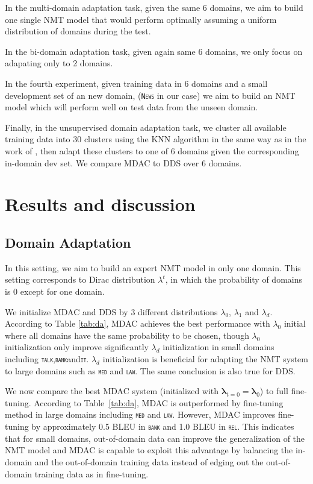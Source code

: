 \documentclass[11pt]{article}
\newcommand{\domain}[1]{\texttt{\textsc{#1}}}
\newcommand{\vlambda}{\ensuremath{\boldsymbol\lambda}\xspace} %
\begin{document}
In the multi-domain adaptation task, given the same 6 domains, we aim to build one single NMT model that would perform optimally assuming a uniform distribution of domains during the test.

In the bi-domain adaptation task, given again same 6 domains, we only focus on adapating only to 2 domains.

In the fourth experiment, given training data in 6 domains and a small development set of an new domain, (\domain{News} in our case) we aim to build an NMT model which will perform well on test data from the unseen domain.

Finally, in the unsupervised domain adaptation task, we cluster all available training data into 30 clusters using the KNN algorithm in the same way as in the work of \citet{Tars18multidomain}, then adapt these clusters to one of 6 domains given the corresponding in-domain dev set. We compare MDAC to DDS over 6 domains.

\section{Results and discussion \label{sec:results}}

\subsection{Domain Adaptation}\label{ssec:da}
In this setting, we aim to build an expert NMT model in only one domain. This setting corresponds to Dirac distribution $\lambda^t$, in which the probability of domains is 0 except for one domain.

We initialize MDAC and DDS by 3 different distributions $\lambda_0$, $\lambda_1$ and $\lambda_d$. According to Table \ref{tab:da}, MDAC achieves the best performance with $\lambda_0$ initial where all domains have the same probability to be chosen, though $\lambda_0$  initialization only improve significantly $\lambda_d$ initialization in small domains including \domain{talk},\domain{bank}and\domain{it}. $\lambda_d$ initialization is beneficial for adapting the NMT system to large domains such as \domain{med} and \domain{law}. The same conclusion is also true for DDS. 

We now compare the best MDAC system (initialized with $\vlambda_{t=0} = \vlambda_0$) to full fine-tuning. According to Table~\ref{tab:da}, MDAC is outperformed by fine-tuning method in large domains including \domain{med} and \domain{law}. However, MDAC improves fine-tuning by approximately 0.5 BLEU in \domain{bank} and 1.0 BLEU in \domain{rel}. This indicates that for small domains, out-of-domain data can improve the generalization of the NMT model and MDAC is capable to exploit this advantage by balancing the in-domain and the out-of-domain training data instead of edging out the out-of-domain training data as in fine-tuning.
\end{document}
